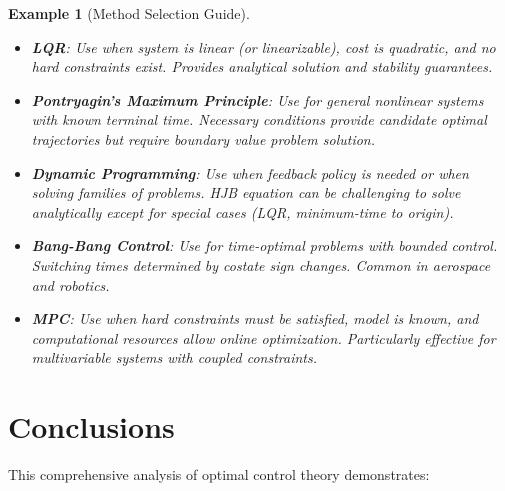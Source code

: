 \documentclass[a4paper, 11pt]{article}
\newtheorem{example}{Example}[section]
\begin{document}
\begin{example}[Method Selection Guide]
\begin{itemize}
\item \textbf{LQR}: Use when system is linear (or linearizable), cost is quadratic, and
no hard constraints exist. Provides analytical solution and stability guarantees.

\item \textbf{Pontryagin's Maximum Principle}: Use for general nonlinear systems with
known terminal time. Necessary conditions provide candidate optimal trajectories but
require boundary value problem solution.

\item \textbf{Dynamic Programming}: Use when feedback policy is needed or when solving
families of problems. HJB equation can be challenging to solve analytically except for
special cases (LQR, minimum-time to origin).

\item \textbf{Bang-Bang Control}: Use for time-optimal problems with bounded control.
Switching times determined by costate sign changes. Common in aerospace and robotics.

\item \textbf{MPC}: Use when hard constraints must be satisfied, model is known, and
computational resources allow online optimization. Particularly effective for
multivariable systems with coupled constraints.
\end{itemize}
\end{example}

\section{Conclusions}

This comprehensive analysis of optimal control theory demonstrates:
\end{document}
